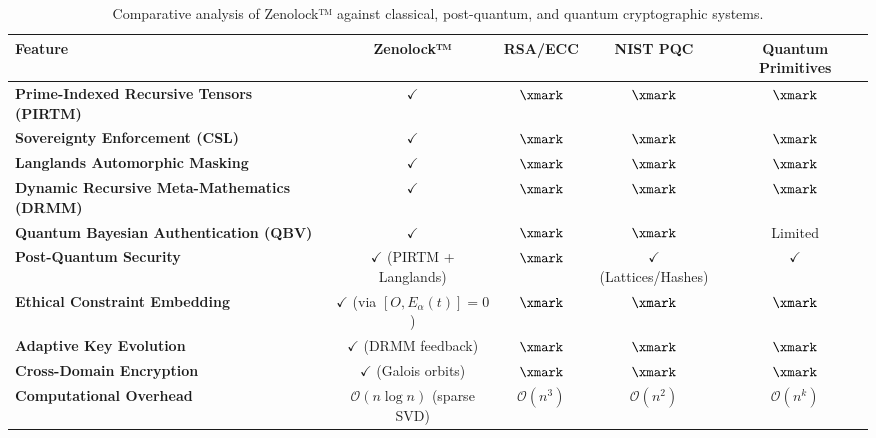 \documentclass{article}
\theoremstyle{plain}
\begin{document}
\begin{table}[h!]
\centering
\begin{tabular}{|l|c|c|c|c|}
\hline
\textbf{Feature} & \textbf{Zenolock™} & \textbf{RSA/ECC} & \textbf{NIST PQC} & \textbf{Quantum Primitives} \\
\hline
\textbf{Prime-Indexed Recursive Tensors (PIRTM)} & $\checkmark$ & $\xmark$ & $\xmark$ & $\xmark$ \\
\hline
\textbf{Sovereignty Enforcement (CSL)} & $\checkmark$ & $\xmark$ & $\xmark$ & $\xmark$ \\
\hline
\textbf{Langlands Automorphic Masking} & $\checkmark$ & $\xmark$ & $\xmark$ & $\xmark$ \\
\hline
\textbf{Dynamic Recursive Meta-Mathematics (DRMM)} & $\checkmark$ & $\xmark$ & $\xmark$ & $\xmark$ \\
\hline
\textbf{Quantum Bayesian Authentication (QBV)} & $\checkmark$ & $\xmark$ & $\xmark$ & Limited \\
\hline
\textbf{Post-Quantum Security} & $\checkmark$ (PIRTM + Langlands) & $\xmark$ & $\checkmark$ (Lattices/Hashes) & $\checkmark$ \\
\hline
\textbf{Ethical Constraint Embedding} & $\checkmark$ (via $[O,E_\alpha(t)]=0$) & $\xmark$ & $\xmark$ & $\xmark$ \\
\hline
\textbf{Adaptive Key Evolution} & $\checkmark$ (DRMM feedback) & $\xmark$ & $\xmark$ & $\xmark$ \\
\hline
\textbf{Cross-Domain Encryption} & $\checkmark$ (Galois orbits) & $\xmark$ & $\xmark$ & $\xmark$ \\
\hline
\textbf{Computational Overhead} & $\mathcal{O}(n \log n)$ (sparse SVD) & $\mathcal{O}(n^3)$ & $\mathcal{O}(n^2)$ & $\mathcal{O}(n^k)$ \\
\hline
\end{tabular}
\caption{Comparative analysis of Zenolock™ against classical, post-quantum, and quantum cryptographic systems.}
\label{tab:comparison}
\end{table}
\end{document}
